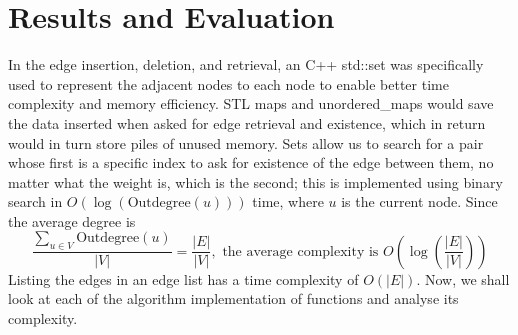 \documentclass[a4paper,12pt]{article}
\begin{document}
\section{ Results and Evaluation}
In the edge insertion, deletion, and retrieval, an C++ std::set was specifically used to represent the adjacent nodes to each node to enable better time complexity and memory efficiency. STL maps and unordered\_maps would save the data inserted when asked for edge retrieval and existence, which in return would in turn store piles of unused memory. Sets allow us to search for a pair whose first is a specific index to ask for existence of the edge between them, no matter what the weight is, which is the second; this is implemented using binary search in $O(\log(\text{Outdegree}(u)))$ time, where $u$ is the current node. Since the average degree is $$\frac{\sum_{u \in V}\text{Outdegree}(u)}{|V|}=\frac{|E|}{|V|},\text{ the average complexity is }O\left(\log\left(\frac{|E|}{|V|}\right)\right)$$ 
Listing the edges in an edge list has a time complexity of $O(|E|)$. Now, we shall look at each of the algorithm implementation of functions and analyse its complexity.
\end{document}
